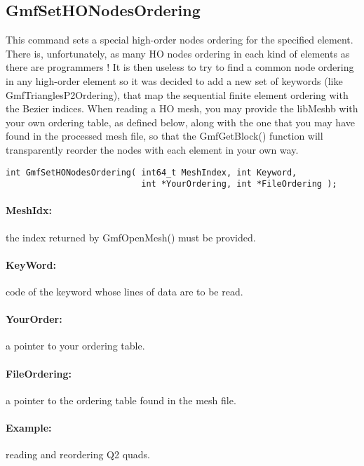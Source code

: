 \documentclass[a4paper,12pt]{article}
\begin{document}
\subsection{GmfSetHONodesOrdering}
This command sets a special high-order nodes ordering for the specified element.
There is, unfortunately, as many HO nodes ordering in each kind of elements as there are programmers !
It is then useless to try to find a common node ordering in any high-order element so it was decided to add a new set of keywords (like GmfTrianglesP2Ordering), that map the sequential finite element ordering with the Bezier indices.
When reading a HO mesh, you may provide the libMeshb with your own ordering table, as defined below, along with the one that you may have found in the processed mesh file, so that the GmfGetBlock() function will transparently reorder the nodes with each element in your own way.

\begin{tt}
\begin{verbatim}
int GmfSetHONodesOrdering( int64_t MeshIndex, int Keyword,
                           int *YourOrdering, int *FileOrdering );
\end{verbatim}
\end{tt}
\normalfont

\paragraph{MeshIdx:}
the index returned by GmfOpenMesh() must be provided.

\paragraph{KeyWord:} code of the keyword whose lines of data are to be read.

\paragraph{YourOrder:} a pointer to your ordering table.

\paragraph{FileOrdering:} a pointer to the ordering table found in the mesh file.

\paragraph{Example:} reading and reordering Q2 quads.
\end{document}
